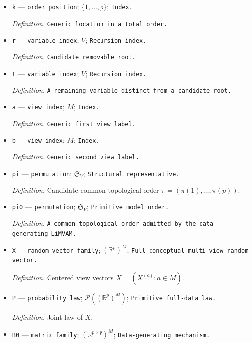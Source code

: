 \documentclass{article}
\begin{document}
\begin{itemize}
  \par\smallskip\noindent\emph{Definition.} \texttt{Generic disturbance or target-\allowbreak{}variable label.}
  \item \texttt{k} --- \texttt{order position}; \(\{1,\ldots,p\}\); \texttt{Index.}
  \par\smallskip\noindent\emph{Definition.} \texttt{Generic location in a total order.}
  \item \texttt{r} --- \texttt{variable index}; \(V\); \texttt{Recursion index.}
  \par\smallskip\noindent\emph{Definition.} \texttt{Candidate removable root.}
  \item \texttt{t} --- \texttt{variable index}; \(V\); \texttt{Recursion index.}
  \par\smallskip\noindent\emph{Definition.} \texttt{A remaining variable distinct from a candidate root.}
  \item \texttt{a} --- \texttt{view index}; \(M\); \texttt{Index.}
  \par\smallskip\noindent\emph{Definition.} \texttt{Generic first view label.}
  \item \texttt{b} --- \texttt{view index}; \(M\); \texttt{Index.}
  \par\smallskip\noindent\emph{Definition.} \texttt{Generic second view label.}
  \item \texttt{pi} --- \texttt{permutation}; \(\mathfrak S_V\); \texttt{Structural representative.}
  \par\smallskip\noindent\emph{Definition.} Candidate common topological order \(\pi=(\pi(1),\ldots,\pi(p))\).
  \item \texttt{pi0} --- \texttt{permutation}; \(\mathfrak S_V\); \texttt{Primitive model order.}
  \par\smallskip\noindent\emph{Definition.} \texttt{A common topological order admitted by the data-\allowbreak{}generating LiMVAM.}
  \item \texttt{X} --- \texttt{random vector family}; \((\mathbb R^p)^M\); \texttt{Full conceptual multi-\allowbreak{}view random vector.}
  \par\smallskip\noindent\emph{Definition.} Centered view vectors \(X=(X^{(a)}:a\in M)\).
  \item \texttt{P} --- \texttt{probability law}; \(\mathcal P((\mathbb R^p)^M)\); \texttt{Primitive full-\allowbreak{}data law.}
  \par\smallskip\noindent\emph{Definition.} Joint law of \(X\).
  \item \texttt{B0} --- \texttt{matrix family}; \((\mathbb R^{p\times p})^M\); \texttt{Data-\allowbreak{}generating mechanism.}

\end{itemize}
\end{document}
